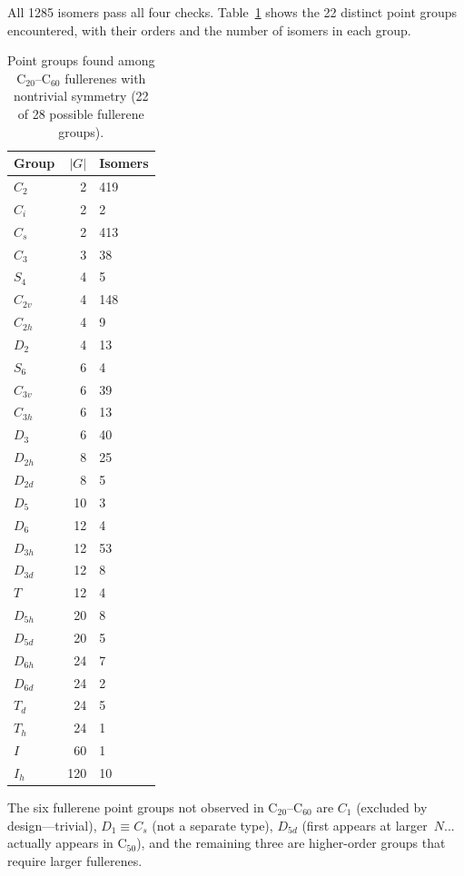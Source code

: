 \documentclass[11pt]{article}
\begin{document}
All 1285 isomers pass all four checks.  Table~\ref{tab:groups} shows
the 22 distinct point groups encountered, with their orders and the
number of isomers in each group.

\begin{table}[ht]
\centering
\caption{Point groups found among C$_{20}$--C$_{60}$ fullerenes with
  nontrivial symmetry (22 of 28 possible fullerene groups).}
\label{tab:groups}
\small
\begin{tabular}{@{}lrl@{}}
\toprule
Group & $|G|$ & Isomers \\
\midrule
$C_2$    &   2 & 419 \\
$C_i$    &   2 &   2 \\
$C_s$    &   2 & 413 \\
$C_3$    &   3 &  38 \\
$S_4$    &   4 &   5 \\
$C_{2v}$ &   4 & 148 \\
$C_{2h}$ &   4 &   9 \\
$D_2$    &   4 &  13 \\
$S_6$    &   6 &   4 \\
$C_{3v}$ &   6 &  39 \\
$C_{3h}$ &   6 &  13 \\
$D_3$    &   6 &  40 \\
$D_{2h}$ &   8 &  25 \\
$D_{2d}$ &   8 &   5 \\
$D_5$    &  10 &   3 \\
$D_6$    &  12 &   4 \\
$D_{3h}$ &  12 &  53 \\
$D_{3d}$ &  12 &   8 \\
$T$      &  12 &   4 \\
$D_{5h}$ &  20 &   8 \\
$D_{5d}$ &  20 &   5 \\
$D_{6h}$ &  24 &   7 \\
$D_{6d}$ &  24 &   2 \\
$T_d$    &  24 &   5 \\
$T_h$    &  24 &   1 \\
$I$      &  60 &   1 \\
$I_h$    & 120 &  10 \\
\bottomrule
\end{tabular}
\end{table}

The six fullerene point groups not observed in C$_{20}$--C$_{60}$ are
$C_1$ (excluded by design---trivial), $D_1 \equiv C_s$ (not a separate
type), $D_{5d}$ (first appears at larger~$N$... actually appears in
C$_{50}$), and the remaining three are higher-order groups that
require larger fullerenes.
\end{document}
